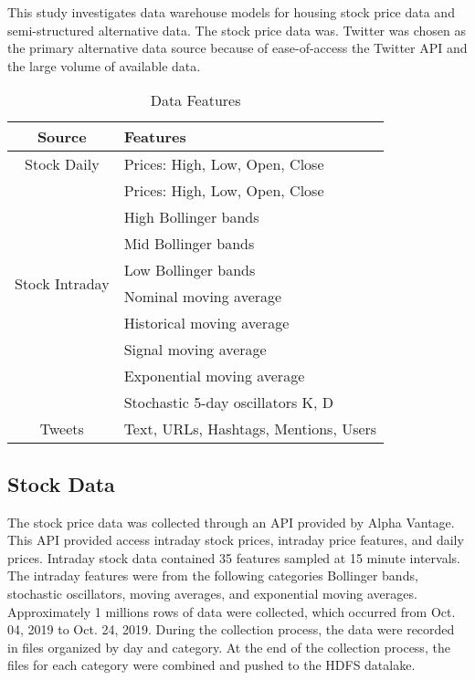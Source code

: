 \documentclass[journal]{IEEEtran}
\begin{document}
This study investigates data warehouse models for housing stock price data and semi-structured alternative data. 
The stock price data was.
Twitter was chosen as the primary alternative data source because of ease-of-access the Twitter API and the large volume of available data.

\begin{table}
	\renewcommand{\arraystretch}{1.3}
	\caption{Data Features}
	\label{DataFeatures}
	\centering
	\begin{tabular}{c|l}
		\hline
		Source       & Features\\
		\hline
		\hline
		Stock Daily  & Prices: High, Low, Open, Close\\
		\hline
		\multirow{8}{*}{Stock Intraday} &  Prices: High, Low, Open, Close \\
		&  High Bollinger bands\\
		&  Mid Bollinger bands\\
		&  Low Bollinger bands\\ 
		&  Nominal moving average\\
		&  Historical moving average\\
		&  Signal moving average\\ 
		&  Exponential moving average\\
		&  Stochastic 5-day oscillators K, D\\
		\hline
		Tweets       & Text, URLs, Hashtags, Mentions, Users\\
		\hline
	\end{tabular}
\end{table}

\subsection{Stock Data}

The stock price data was collected through an API provided by Alpha Vantage.
This API provided access intraday stock prices, intraday price features, and daily prices.
Intraday stock data contained 35 features sampled at 15 minute intervals. 
The intraday features were from the following categories Bollinger bands, stochastic oscillators, moving averages, and exponential moving averages.
Approximately 1 millions rows of data were collected, which occurred from Oct. 04, 2019 to Oct. 24, 2019.
During the collection process, the data were recorded in files organized by day and category.
At the end of the collection process, the files for each category were combined and pushed to the HDFS datalake.
\end{document}
